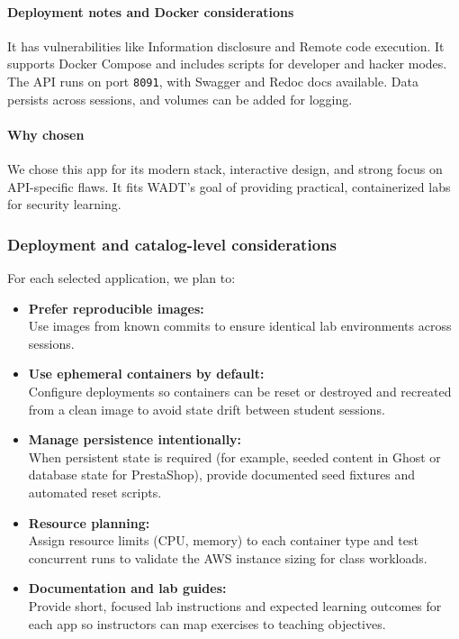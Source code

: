 \documentclass[12pt]{article}
\begin{document}
\paragraph{Deployment notes and Docker considerations}
It has vulnerabilities like Information disclosure and Remote code execution. It supports Docker Compose and includes scripts for developer and hacker modes. The API runs on port \texttt{8091}, with Swagger and Redoc docs available. Data persists across sessions, and volumes can be added for logging.

\paragraph{Why chosen}
We chose this app for its modern stack, interactive design, and strong focus on API-specific flaws. It fits WADT’s goal of providing practical, containerized labs for security learning.

\subsubsection{Deployment and catalog-level considerations}
For each selected application, we plan to:
\begin{itemize}
    \item \textbf{Prefer reproducible images:}\\ Use images from known commits to ensure identical lab environments across sessions.
    \item \textbf{Use ephemeral containers by default:}\\ Configure deployments so containers can be reset or destroyed and recreated from a clean image to avoid state drift between student sessions.
    \item \textbf{Manage persistence intentionally:}\\ When persistent state is required (for example, seeded content in Ghost or database state for PrestaShop), provide documented seed fixtures and automated reset scripts.
    \item \textbf{Resource planning:}\\ Assign resource limits (CPU, memory) to each container type and test concurrent runs to validate the AWS instance sizing for class workloads.
    \item \textbf{Documentation and lab guides:}\\ Provide short, focused lab instructions and expected learning outcomes for each app so instructors can map exercises to teaching objectives.
\end{itemize}
\end{document}
